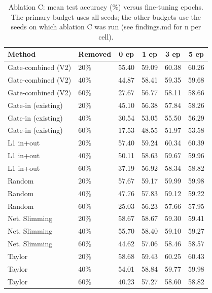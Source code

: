 \begin{table}[t]
\centering
\caption{Ablation C: mean test accuracy (\%) versus fine-tuning epochs. The primary budget uses all seeds; the other budgets use the seeds on which ablation C was run (see findings.md for n per cell).}
\label{tab:ablation_c}
\footnotesize
\setlength{\tabcolsep}{4pt}
\begin{tabular}{llcccc}
\toprule
Method & Removed & 0 ep & 1 ep & 3 ep & 5 ep \\
\midrule
Gate-combined (V2) & 20\% & 55.40 & 59.09 & 60.38 & 60.26 \\
Gate-combined (V2) & 40\% & 44.87 & 58.41 & 59.35 & 59.68 \\
Gate-combined (V2) & 60\% & 27.67 & 56.77 & 58.11 & 58.66 \\
Gate-in (existing) & 20\% & 45.10 & 56.38 & 57.84 & 58.26 \\
Gate-in (existing) & 40\% & 30.54 & 53.05 & 55.50 & 56.29 \\
Gate-in (existing) & 60\% & 17.53 & 48.55 & 51.97 & 53.58 \\
L1 in+out & 20\% & 57.40 & 59.24 & 60.34 & 60.39 \\
L1 in+out & 40\% & 50.11 & 58.63 & 59.67 & 59.96 \\
L1 in+out & 60\% & 37.19 & 56.92 & 58.34 & 58.82 \\
Random & 20\% & 57.67 & 59.17 & 59.99 & 59.98 \\
Random & 40\% & 47.76 & 57.83 & 59.12 & 59.22 \\
Random & 60\% & 25.03 & 56.23 & 57.66 & 57.95 \\
Net. Slimming & 20\% & 58.67 & 58.67 & 59.30 & 59.41 \\
Net. Slimming & 40\% & 55.70 & 58.40 & 59.10 & 59.27 \\
Net. Slimming & 60\% & 44.62 & 57.06 & 58.46 & 58.57 \\
Taylor & 20\% & 58.68 & 59.43 & 60.25 & 60.43 \\
Taylor & 40\% & 54.01 & 58.84 & 59.77 & 59.98 \\
Taylor & 60\% & 40.23 & 57.27 & 58.60 & 58.82 \\
\bottomrule
\end{tabular}
\end{table}
